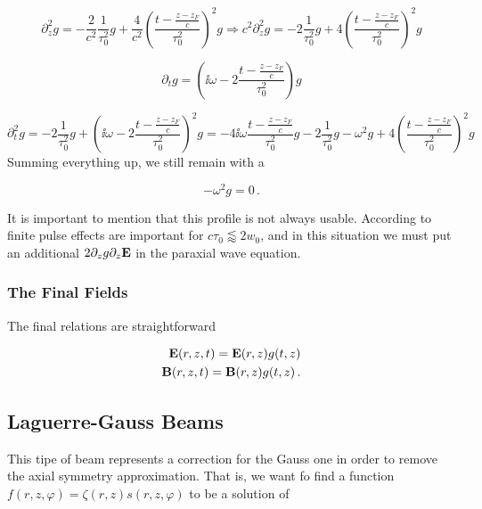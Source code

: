 \documentclass[12pt, class=report, crop=false]{standalone}
\begin{document}
\begin{equation}
  \partial_z^2 g = - \frac{2}{c^2} \frac{1}{\tau_0^2} g + \frac{4}{c^2} \left(\frac{t-\frac{z-z_F}{c}}{\tau_0^2} \right)^2 g \Rightarrow c^2\partial_z^2 g = - 2 \frac{1}{\tau_0^2} g+ 4 \left(\frac{t-\frac{z-z_F}{c}}{\tau_0^2} \right)^2 g
\end{equation}

\begin{equation}
  \partial_t g = \left(\ii \omega - 2 \frac{t-\frac{z-z_F}{c}}{\tau_0^2} \right) g
\end{equation}

\begin{equation}
  \partial_t^2 g = - 2 \frac{1}{\tau_0^2} g + \left(\ii \omega - 2 \frac{t-\frac{z-z_F}{c}}{\tau_0^2} \right)^2 g = - 4\ii \omega \frac{t-\frac{z-z_F}{c}}{\tau_0^2} g - 2 \frac{1}{\tau_0^2} g - \omega^2 g+ 4 \left(\frac{t-\frac{z-z_F}{c}}{\tau_0^2} \right)^2 g
\end{equation}
Summing everything up, we still remain with a

\begin{equation}
  - \omega^2 g = 0\,.
\end{equation}

It is important to mention that this profile is not always usable. According to~\cite{quesnelTheorySimulationInteraction1998} finite pulse effects are important for \(c\tau_0  \lessapprox 2w_0\), and in this situation we must put an additional \(2 \partial_z
 g \partial_z \vb{E}\) in the paraxial wave equation.

\subsubsection{The Final Fields}

The final relations are straightforward

\begin{subequations}
  \begin{align}
    \vb{E}(r,z,t) = \vb{E}(r,z) g(t,z) \\
    \vb{B}(r,z,t) = \vb{B}(r,z) g(t,z)\,.
  \end{align}
\end{subequations}

\subsection{Laguerre-Gauss Beams}
This tipe of beam represents a correction for the Gauss one in order to remove the axial symmetry approximation. That is, we want fo find a function \(f(r,z,\varphi) = \zeta (r,z) s(r,z,\varphi)\) to be a solution of
\end{document}
